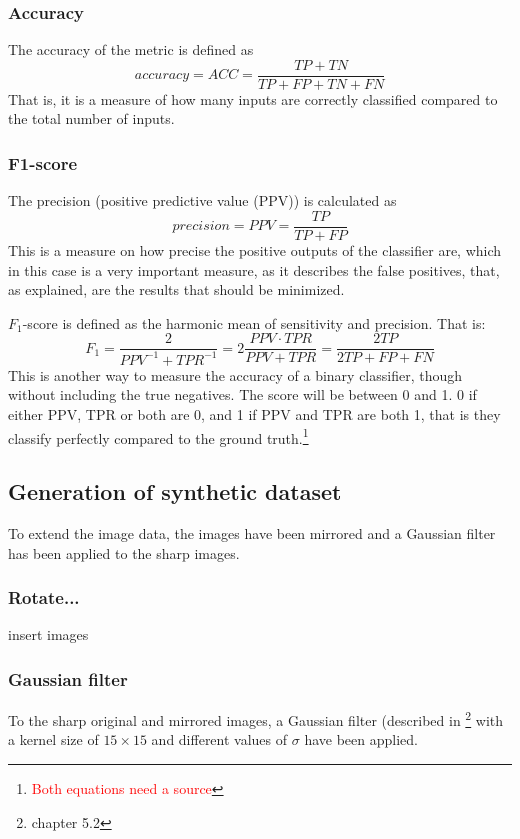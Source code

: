 \subsubsection{Accuracy}
The accuracy of the metric is defined as
$$accuracy = ACC = \dfrac{TP+TN}{TP+FP + TN+FN}$$
That is, it is a measure of how many inputs are correctly classified compared to the total number of inputs.

\subsubsection{F1-score}
The precision (positive predictive value (PPV)) is calculated as
$$precision = PPV = \dfrac{TP}{TP + FP}$$
This is a measure on how precise the positive outputs of the classifier are, which in this case is a very important measure, as it describes the false positives, that, as explained, are the results that should be minimized.

$F_1$-score is defined as the harmonic mean of sensitivity and precision. That is:
$$F_1 = \dfrac{2}{PPV^{-1} + TPR^{-1}} = 2\dfrac{PPV\cdot TPR}{PPV + TPR} = \dfrac{2TP}{2TP+FP+FN}$$
This is another way to measure the accuracy of a binary classifier, though without including the true negatives. The score will be between 0 and 1. 0 if either PPV, TPR or both are 0, and 1 if PPV and TPR are both 1, that is they classify perfectly compared to the ground truth.\footnote{\textcolor{red}{Both equations need a source}}



\subsection{Generation of synthetic dataset}
To extend the image data, the images have been mirrored and a Gaussian filter has been applied to the sharp images.\\

\subsubsection{Rotate...}
insert images

\subsubsection{Gaussian filter}

To the sharp original and mirrored images, a Gaussian filter (described in \cite{img_analysis}\footnote{chapter 5.2} with a kernel size of $15\times15$ and different values of $\sigma$ have been applied.

